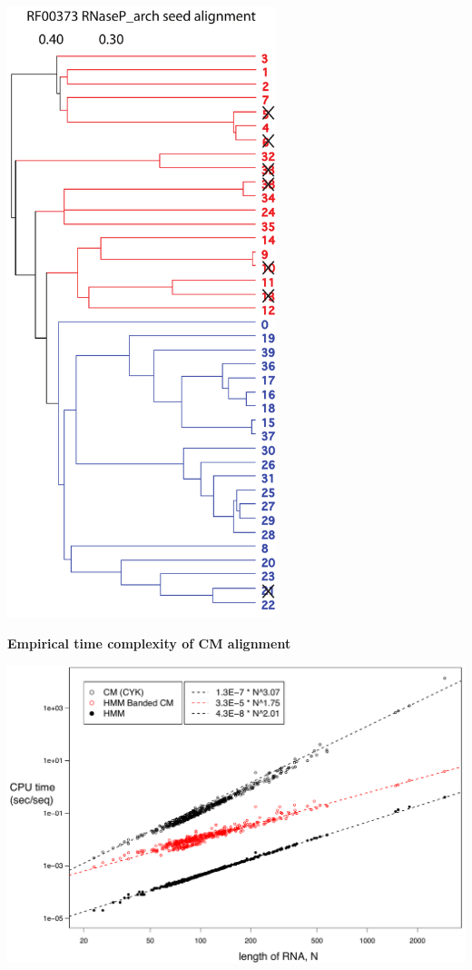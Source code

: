 \documentclass[landscape]{slides}
\begin{document}
\begin{slide}
\begin{minipage}{3.5in}
\begin{center}
\includegraphics[height=7in]{figs/u8-RF00373-tree}

\end{center}
\end{minipage}
\end{slide}
%
\begin{slide}
\begin{center}
\textbf{Empirical time complexity of CM alignment}

\includegraphics[width=10in]{figs/aln-complexity}

\vfill
\end{center}
\end{slide}
\end{document}
